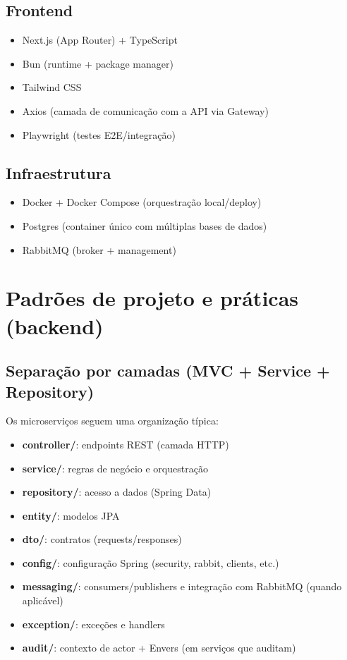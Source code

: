 \documentclass[11pt,a4paper]{article}
\begin{document}
\subsection{Frontend}
\begin{itemize}[nosep]
  \item Next.js (App Router) + TypeScript
  \item Bun (runtime + package manager)
  \item Tailwind CSS
  \item Axios (camada de comunicação com a API via Gateway)
  \item Playwright (testes E2E/integração)
\end{itemize}

\subsection{Infraestrutura}
\begin{itemize}[nosep]
  \item Docker + Docker Compose (orquestração local/deploy)
  \item Postgres (container único com múltiplas bases de dados)
  \item RabbitMQ (broker + management)
\end{itemize}

\section{Padrões de projeto e práticas (backend)}
\subsection{Separação por camadas (MVC + Service + Repository)}
Os microserviços seguem uma organização típica:
\begin{itemize}[nosep]
  \item \textbf{controller/}: endpoints REST (camada HTTP)
  \item \textbf{service/}: regras de negócio e orquestração
  \item \textbf{repository/}: acesso a dados (Spring Data)
  \item \textbf{entity/}: modelos JPA
  \item \textbf{dto/}: contratos (requests/responses)
  \item \textbf{config/}: configuração Spring (security, rabbit, clients, etc.)
  \item \textbf{messaging/}: consumers/publishers e integração com RabbitMQ (quando aplicável)
  \item \textbf{exception/}: exceções e handlers
  \item \textbf{audit/}: contexto de actor + Envers (em serviços que auditam)
\end{itemize}
\end{document}
